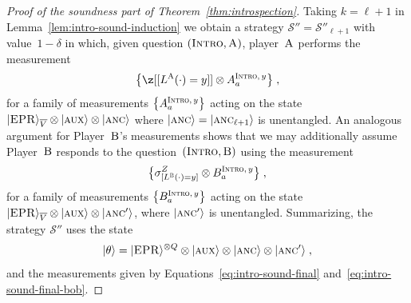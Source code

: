 \documentclass[11pt]{article}
\theoremstyle{definition}
\newcommand{\ket}[1]{|#1\rangle}
\newcommand{\strategy}{\mathscr{S}}
\newcommand{\labelstyle}[1]{\ensuremath{\textsc{#1}}\xspace}
\newcommand{\EPR}{\labelstyle{EPR}}
\newcommand{\aux}{\labelstyle{aux}}
\newcommand{\ancilla}{\labelstyle{anc}}
\newcommand{\alice}{\labelstyle{A}}
\newcommand{\bob}{\labelstyle{B}}
\newcommand{\typestyle}[1]{\ensuremath{\textsc{#1}}\xspace}
\newcommand{\Introspect}{\typestyle{Intro}}
\newcommand{\Intro}{\typestyle{Intro}}
\begin{document}
\begin{proof}[Proof of the soundness part of Theorem~\ref{thm:introspection}]
  Taking $k = \ell+1$ in Lemma~\ref{lem:intro-sound-induction} we obtain a
  strategy $\strategy''=\strategy''_{\ell+1}$ with value~$1-\delta$ in which,
  given question $(\Introspect, \alice)$, player~$\alice$ performs the
  measurement
  \begin{equation}
    \label{eq:intro-sound-final}
    \bigl\{ \z[{[L^\alice(\cdot)=y]}] \otimes A^{\Intro,\, y}_a \bigr\} \;,
  \end{equation}
  for a family of measurements $\bigl\{ A^{\Intro,\, y}_a \bigr\}$ acting on the
  state $\ket{\EPR}_{\overline{V}} \otimes \ket{\aux} \otimes \ket{\ancilla}$
where $\ket{\ancilla}=\ket{\ancilla_{\ell+1}}$ is unentangled.
  An analogous argument for Player~$\bob$'s measurements shows that we may
  additionally assume Player~$\bob$ responds to the question~$(\Introspect,
  \bob)$ using the measurement
  \begin{equation}
    \label{eq:intro-sound-final-bob}
    \bigl\{\sigma^Z_{[L^\bob(\cdot)=y]} \otimes
    B^{\Intro,\, y}_a\bigr\}\;,  
  \end{equation}
  for a family of measurements $\bigl\{ B^{\Intro,\, y}_a \bigr\}$ acting on the
  state $\ket{\EPR}_{\overline{V}} \otimes\ket{\aux} \otimes \ket{\ancilla'}$,
  where $\ket{\ancilla'}$ is unentangled.
  Summarizing, the strategy $\strategy''$ uses the state
  \begin{equation*}
    \ket{\theta} = \ket{\EPR}^{\otimes Q} \otimes \ket{\aux} \otimes
    \ket{\ancilla} \otimes \ket{\ancilla'}\;,
  \end{equation*}
  and the measurements given by Equations~\eqref{eq:intro-sound-final}
  and~\eqref{eq:intro-sound-final-bob}.
  

\end{proof}
\end{document}

